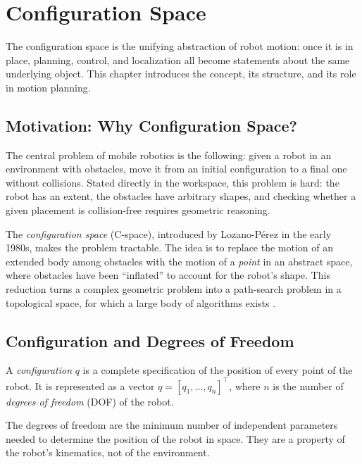 \chapter{Configuration Space}
\label{ch:configuration-space}

The configuration space is the unifying abstraction of robot motion:
once it is in place, planning, control, and localization all become
statements about the same underlying object. This chapter introduces
the concept, its structure, and its role in motion planning.

\section{Motivation: Why Configuration Space?}
\label{sec:why-cspace}

The central problem of mobile robotics is the following: given a robot
in an environment with obstacles, move it from an initial configuration
to a final one without collisions. Stated directly in the workspace,
this problem is hard: the robot has an extent, the obstacles have
arbitrary shapes, and checking whether a given placement is collision-free
requires geometric reasoning.

The \emph{configuration space} (C-space), introduced by Lozano-Pérez in
the early 1980s, makes the problem tractable. The idea is to replace
the motion of an extended body among obstacles with the motion of a
\emph{point} in an abstract space, where obstacles have been ``inflated''
to account for the robot's shape. This reduction turns a complex
geometric problem into a path-search problem in a topological space,
for which a large body of algorithms exists
\cite{choset2005principles, siciliano2025foundations}.

\section{Configuration and Degrees of Freedom}
\label{sec:configuration-dof}

\begin{definition}[Configuration]
A \emph{configuration} \( q \) is a complete specification of the
position of every point of the robot. It is represented as a vector
\( q = [q_1, \dots, q_n]^\top \), where \( n \) is the number of
\emph{degrees of freedom} (DOF) of the robot.
\end{definition}

The degrees of freedom are the minimum number of independent parameters
needed to determine the position of the robot in space. They are a
property of the robot's kinematics, not of the environment.

